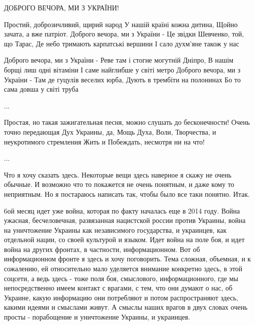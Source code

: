  
 
 
 
 

ДОБРОГО ВЕЧОРА, МИ З УКРАЇНИ!

Простий, доброзичливий, щирий народ
У нашій країні кожна дитина, 
Щойно зачата, а вже патріот. 
Доброго вечора, ми з України - 
Це звідки Шевченко, той, що Тарас,
Де небо тримають карпатські вершини
І сало духм'яне також у нас 

Доброго вечора, ми з України - 
Реве там і стогне могутній Дніпро,
В нашім борщі лиш одні вітаміни
І саме найглибше у світі метро
Доброго вечора, ми з України -
Там де гуцулів веселих юрба,
Дують в трембіти на полонинах
Бо то сама довша у світі труба

...

Простая, но такая зажигательная песня, можно слушать до бесконечности!  Очень
точно передающая Дух Украины, да, Мощь Духа, Воли, Творчества, и неукротимого
стремления Жить и Побеждать, несмотря ни на что!

...

Что я хочу сказать здесь. Некоторые вещи здесь наверное я скажу не очень
обычные.  И возможно что то покажется не очень понятным, и даже кому то
неприятным.  Но я постараюсь написать так, чтобы было все таки понятно. Итак. 

6ой месяц идет уже война, которая по факту началась еще в 2014 году. Война
ужасная, бесчеловечная, развязанная нацистской россии против Украины, война на
уничтожение Украины как независимого государства, и украинцев, как отдельной
нации, со своей культурой и языком.  Идет война на поле боя, и идет война на
других фронтах, в частности, информационном. Вот об информационном фронте я
здесь и хочу поговорить. Тема сложная, объемная, и к сожалению, ей относительно
мало уделяется внимание конкретно здесь, в этой соцсети, а ведь здесь - тоже
поля боя, смыслового, информационного, где мы непосредственно имеем контакт с
врагами, с тем, что они думают о нас, об Украине, какую информацию они
потребляют и потом распространяют здесь, какими идеями и смыслами живут. А
смыслы наших врагов в двух словах очень просты - порабощение и уничтожение
Украины, и украинцев. 

